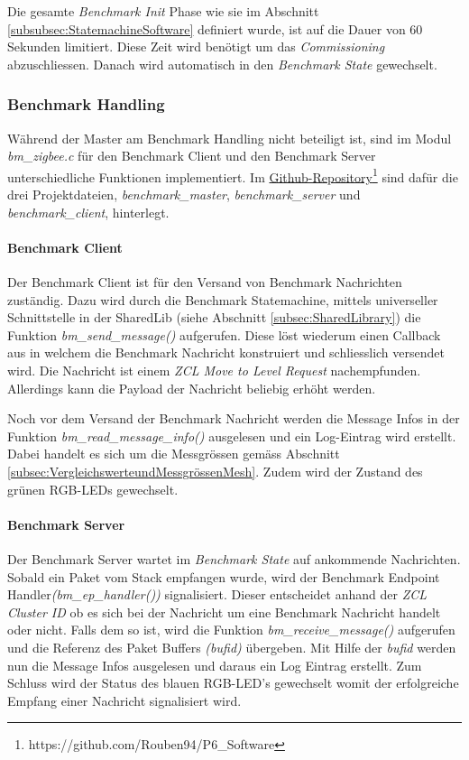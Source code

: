 Die gesamte \textit{Benchmark Init} Phase wie sie im Abschnitt \ref{subsubsec:StatemachineSoftware} definiert wurde, ist auf die Dauer von 60 Sekunden limitiert.
Diese Zeit wird benötigt um das \textit{Commissioning} abzuschliessen.
Danach wird automatisch in den \textit{Benchmark State} gewechselt.

\subsubsection{Benchmark Handling}\label{subsubsec:ZigbeeBenchmarkHandling}
Während der Master am Benchmark Handling nicht beteiligt ist,  sind im Modul \textit{bm\_zigbee.c} für den Benchmark Client und den Benchmark Server unterschiedliche Funktionen implementiert.
Im \href{https://github.com/Rouben94/P6_Software}{Github-Repository\footnote{\url{https://github.com/Rouben94/P6_Software}\cite{anklin_bobst_horath_rouben94p6_software_nodate}}} sind dafür die drei Projektdateien, \textit{benchmark\_master}, \textit{benchmark\_server} und \textit{benchmark\_client}, hinterlegt.

\paragraph{Benchmark Client}
Der Benchmark Client ist für den Versand von Benchmark Nachrichten zuständig.
Dazu wird durch die Benchmark Statemachine, mittels universeller Schnittstelle in der SharedLib (siehe Abschnitt \ref{subsec:SharedLibrary}) die Funktion \textit{bm\_send\_message()} aufgerufen.
Diese löst wiederum einen Callback aus in welchem die Benchmark Nachricht konstruiert und schliesslich versendet wird.
Die Nachricht ist einem \textit{ZCL Move to Level Request} nachempfunden.
Allerdings kann die Payload der Nachricht beliebig erhöht werden.

Noch vor dem Versand der Benchmark Nachricht werden die Message Infos in der Funktion \textit{bm\_read\_message\_info()} ausgelesen und ein Log-Eintrag wird erstellt.
Dabei handelt es sich um die Messgrössen gemäss Abschnitt \ref{subsec:VergleichswerteundMessgrössenMesh}.
Zudem wird der Zustand des grünen RGB-LEDs gewechselt.

\paragraph{Benchmark Server}
Der Benchmark Server wartet im \textit{Benchmark State} auf ankommende Nachrichten.
Sobald ein Paket vom Stack empfangen wurde, wird der Benchmark Endpoint Handler\linebreak \textit{(bm\_ep\_handler())} signalisiert.
Dieser entscheidet anhand der \textit{ZCL Cluster ID} ob es sich bei der Nachricht um eine Benchmark Nachricht handelt oder nicht.
Falls dem so ist, wird die Funktion \textit{bm\_receive\_message()} aufgerufen und die Referenz des Paket Buffers \textit{(bufid)} übergeben.
Mit Hilfe der \textit{bufid} werden nun die Message Infos ausgelesen und daraus ein Log Eintrag erstellt.
Zum Schluss wird der Status des blauen RGB-LED's gewechselt womit der erfolgreiche Empfang einer Nachricht signalisiert wird.




